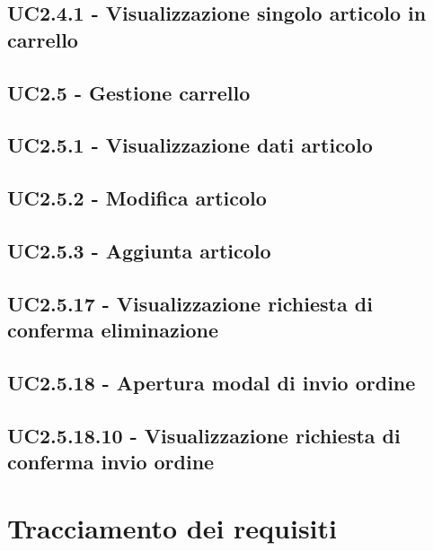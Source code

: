 \subsection{UC2.4.1 - Visualizzazione singolo articolo in carrello}

\subsection{UC2.5 - Gestione carrello}

\subsection{UC2.5.1 - Visualizzazione dati articolo}

\subsection{UC2.5.2 - Modifica articolo}

\subsection{UC2.5.3 - Aggiunta articolo}

\subsection{UC2.5.17 - Visualizzazione richiesta di conferma eliminazione}

\subsection{UC2.5.18 - Apertura modal di invio ordine}

\subsection{UC2.5.18.10 - Visualizzazione richiesta di conferma invio ordine}

\section{Tracciamento dei requisiti}


